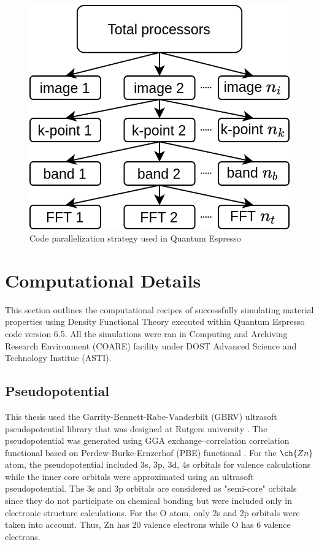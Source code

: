 \begin{figure}[tbh!]
	\centering
	\includegraphics[width=0.48\linewidth]{"images/parallelization"}
	\caption[Code parallelization strategy used in Quantum Espresso]{Code parallelization strategy used in Quantum Espresso}
	\label{fig:code_parallel}
\end{figure}



\section{Computational Details}
This section outlines the computational recipes of successfully simulating material properties using Density Functional Theory executed within  Quantum Espresso code version 6.5. All the simulations were ran in Computing and Archiving Research Environment (COARE) facility under DOST Advanced Science and Technology Institue (ASTI).

\subsection{Pseudopotential}
This thesis used the Garrity-Bennett-Rabe-Vanderbilt (GBRV) ultrasoft pseudopotential library that was designed at Rutgers university \citep{Garrity2014}. The pseudopotential was generated using GGA exchange–correlation correlation functional based on Perdew-Burke-Ernzerhof (PBE) functional \citep{Perdew1996}. For the $\ch{Zn}$ atom, the pseudopotential included 3s, 3p, 3d, 4s orbitals for valence calculations  while the inner core orbitals were approximated using an ultrasoft pseudopotential. The 3s and 3p orbitals are considered as "semi-core" orbitals since they do not participate on chemical bonding but were included only in electronic structure calculations. For the O atom, only  2s and 2p orbitals were taken into account. Thus, Zn has 20 valence electrons while O has 6 valence electrons.

